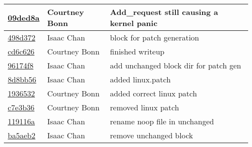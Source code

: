 \documentclass[letterpaper,10pt,draftclsnofoot,onecolumn,titlepage]{IEEEtran}
\begin{document}
\begin{tabular}{p{2cm} p{3cm} p{12cm}}
\href{https://github.com/courtbonn/CS-444/commit/09ded8afcdf70a8b47e7035542c62d93e76d51dd}{09ded8a} & Courtney Bonn & Add\_request still causing a kernel panic\\\hline
\href{https://github.com/courtbonn/CS-444/commit/498d37252ce619ec5b677dfd70ea2dd315daae75}{498d372} & Isaac Chan & block for patch generation\\\hline
\href{https://github.com/courtbonn/CS-444/commit/cd6c6269ddabeed3e7a761cc42041564bff86d4f}{cd6c626} & Courtney Bonn & finished writeup\\\hline
\href{https://github.com/courtbonn/CS-444/commit/96174f8ba4be80b2cb15a629ad468998537600ea}{96174f8} & Isaac Chan & add unchanged block dir for patch gen\\\hline
\href{https://github.com/courtbonn/CS-444/commit/8d8bb56c6b4e6287ad20283cba4560f59e3e21dd}{8d8bb56} & Isaac Chan & added linux.patch\\\hline
\href{https://github.com/courtbonn/CS-444/commit/193653232e83d3b72dab544abc48d95c78bb2e2c}{1936532} & Courtney Bonn & added correct linux patch\\\hline
\href{https://github.com/courtbonn/CS-444/commit/c7e3b36a90dc324a0bd24af5bbebe27b8f2cd352}{c7e3b36} & Courtney Bonn & removed linux patch\\\hline
\href{https://github.com/courtbonn/CS-444/commit/119116a604998aba96ad0479b6309bbd25d10019}{119116a} & Isaac Chan & rename noop file in unchanged\\\hline
\href{https://github.com/courtbonn/CS-444/commit/ba5aeb22ab9d21ca25fc05605a65288d43e52762}{ba5aeb2} & Isaac Chan & remove unchanged block\\\hline\end{tabular}
\end{document}
